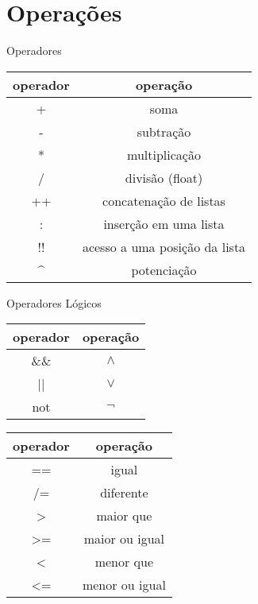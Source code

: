 \documentclass{beamer}
\begin{document}
	\section{Operações}
	\begin{frame}{Operadores}
	 \begin{table}[h]
	  \centering
	  \begin{tabular}{c | c}
			operador & operação\\
			\hline
			+ & soma \\
			- & subtração \\
			* & multiplicação\\
			/ & divisão (float)\\
			++ & concatenação de listas\\
			: & inserção em uma lista\\
			!! & acesso a uma posição da lista\\
			\textasciicircum & potenciação\\
	  \end{tabular}
	 \end{table}	 
	\end{frame}
	
	\begin{frame}{Operadores Lógicos}
	 
	 \begin{table}[h]
	  \begin{tabular}{c | c}
	   operador & operação\\
	   \hline
	   \&\& & $\land$ \\
	   || & $\lor$ \\
	   not & $\lnot$ \\
	  \end{tabular}
	 \end{table}
	 
	 \begin{table}[h]
	  \begin{tabular}{c | c}
	   operador & operação\\
	   \hline
	   == & igual \\
	   /= & diferente \\
	   > & maior que \\
	   >= & maior ou igual \\
	   < & menor que \\
	   <= & menor ou igual \\
	  \end{tabular}
	 \end{table} 
	\end{frame}
	
\end{document}
